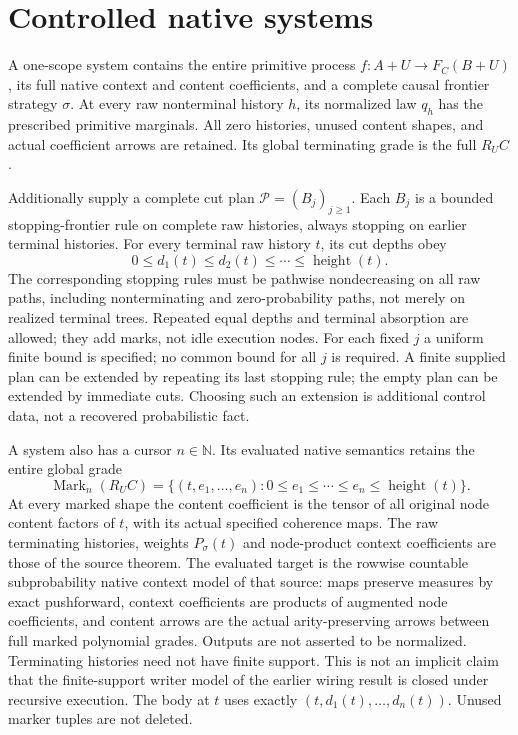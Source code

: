 \documentclass{article}
\begin{document}
\section{Controlled native systems}
A one-scope system contains the entire primitive process
$f:A+U\to F_C(B+U)$, its full native context and content coefficients, and a
complete causal frontier strategy $\sigma$. At every raw nonterminal history
$h$, its normalized law $q_h$ has the prescribed primitive marginals. All
zero histories, unused content shapes, and actual coefficient arrows are
retained. Its global terminating grade is the full $R_UC$.

Additionally supply a complete cut plan $\mathcal P=(B_j)_{j\geq1}$. Each
$B_j$ is a bounded stopping-frontier rule on complete raw histories, always
stopping on earlier terminal histories. For every terminal raw history $t$,
its cut depths obey
\[
 0\leq d_1(t)\leq d_2(t)\leq\cdots\leq\operatorname{height}(t).
\]
The corresponding stopping rules must be pathwise nondecreasing on all raw
paths, including nonterminating and zero-probability paths, not merely on
realized terminal trees. Repeated equal depths and terminal absorption are
allowed; they add marks, not idle execution nodes. For each fixed $j$ a
uniform finite bound is specified; no common bound for all $j$ is required.
A finite supplied plan can be extended by repeating its last stopping rule;
the empty plan can be extended by immediate cuts. Choosing such an extension
is additional control data, not a recovered probabilistic fact.

A system also has a cursor $n\in\mathbb N$. Its evaluated native semantics
retains the entire global grade
\[
 \operatorname{Mark}_n(R_UC)
 =\{(t,e_1,\ldots,e_n):0\leq e_1\leq\cdots\leq e_n
                                \leq\operatorname{height}(t)\}.
 \tag{G}
\]
At every marked shape the content coefficient is the tensor of all original
node content factors of $t$, with its actual specified coherence maps.
The raw terminating histories, weights $P_\sigma(t)$ and node-product context
coefficients are those of the source theorem. The evaluated target is the
rowwise countable subprobability native context model of that source: maps
preserve measures by exact pushforward, context coefficients are products of
augmented node coefficients, and content arrows are the actual arity-preserving
arrows between full marked polynomial grades. Outputs are not asserted to be
normalized. Terminating
histories need not have finite support. This is not an implicit claim that
the finite-support writer model of the earlier wiring result is closed under
recursive execution. The body at $t$ uses exactly
$(t,d_1(t),\ldots,d_n(t))$. Unused marker tuples are not deleted.
\end{document}
